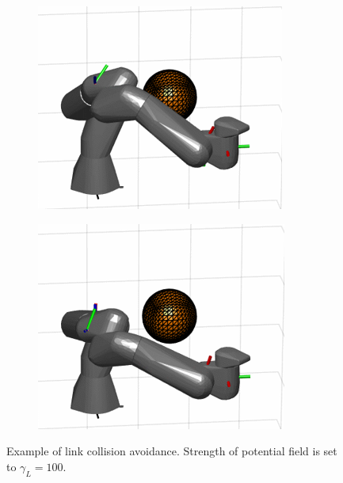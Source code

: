 \documentclass[../main.tex]{subfiles}
\begin{document}
\begin{figure}[H]
    \hfill
    \begin{subfigure}[b]{0.24\textwidth}
        \centering
         \includegraphics[width=\textwidth]{figures/linkcollision/g100_3.png}
        \label{}
    \end{subfigure}
    \hfill
    \begin{subfigure}[b]{0.24\textwidth}
        \centering
         \includegraphics[width=\textwidth]{figures/linkcollision/g100_4.png}
        \label{}
    \end{subfigure}
    \caption{Example of link collision avoidance. Strength of potential field is set to $\gamma_L = 100$.}
    \label{fig:link:example:collisionavoidance}
\end{figure}
\end{document}
